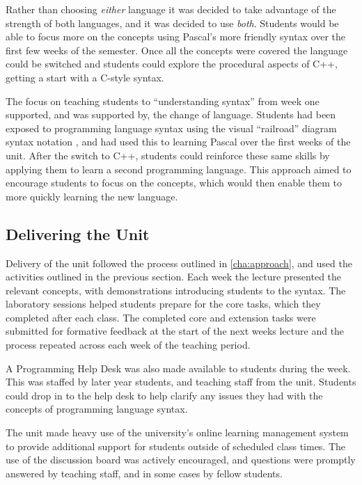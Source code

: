 Rather than choosing \emph{either} language it was decided to take advantage of the strength of both languages, and it was decided to use \emph{both}. Students would be able to focus more on the concepts using Pascal's more friendly syntax over the first few weeks of the semester. Once all the concepts were covered the language could be switched and students could explore the procedural aspects of C++, getting a start with a C-style syntax.

The focus on teaching students to ``understanding syntax'' from week one supported, and was supported by, the change of language. Students had been exposed to programming language syntax using the visual ``railroad'' diagram syntax notation \cite{Braz:1990}, and had used this to learning Pascal over the first weeks of the unit. After the switch to C++, students could reinforce these same skills by applying them to learn a second programming language. This approach aimed to encourage students to focus on the concepts, which would then enable them to more quickly learning the new language.




\subsection{Delivering the Unit} %
\label{sub:delivering_the_unit}

Delivery of the unit followed the process outlined in \cref{cha:approach}, and used the activities outlined in the previous section. Each week the lecture presented the relevant concepts, with demonstrations introducing students to the syntax. The laboratory sessions helped students prepare for the core tasks, which they completed after each class. The completed core and extension tasks were submitted for formative feedback at the start of the next weeks lecture and the process repeated across each week of the teaching period.

A Programming Help Desk was also made available to students during the week. This was staffed by later year students, and teaching staff from the unit. Students could drop in to the help desk to help clarify any issues they had with the concepts of programming language syntax.

The unit made heavy use of the university's online learning management system to provide additional support for students outside of scheduled class times. The use of the discussion board was actively encouraged, and questions were promptly answered by teaching staff, and in some cases by fellow students. 

